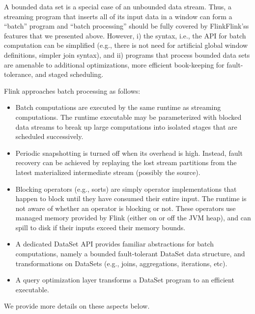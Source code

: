 \documentclass[11pt]{article}
\begin{document}
A bounded data set is a special case of an unbounded data stream. Thus, a streaming program that inserts all of its input data in a window can form a “batch” program and “batch processing” should be fully covered by FlinkFlink'ss features that we presented above. However, i) the syntax, i.e., the API for batch computation can be simplified (e.g., there is not need for artificial global window definitions, simpler join syntax), and ii) programs that process bounded data sets are amenable to additional optimizations, more efficient book-keeping for fault-tolerance, and staged scheduling.

\vspace{2mm}
\noindent Flink approaches batch processing as follows:\vspace{-3mm}
\begin{itemize}
	\item Batch computations are executed by the same runtime as streaming computations. The runtime executable may be parameterized with blocked data streams to break up large computations into isolated stages that are scheduled successively. \vspace{-3mm}
	\item Periodic snapshotting is turned off when its overhead is high. Instead, fault recovery can be achieved by replaying the lost stream partitions from the latest materialized intermediate stream (possibly the source).\vspace{-3mm}
	\item Blocking operators (e.g., sorts) are simply operator implementations that happen to block until they have consumed their entire input. The runtime is not aware of whether an operator is blocking or not. These operators use managed memory provided by Flink (either on or off the JVM heap), and can spill to disk if their inputs exceed their memory bounds.\vspace{-3mm}
	\item A dedicated DataSet API provides familiar abstractions for batch computations, namely a bounded fault-tolerant DataSet data structure, and transformations on DataSets (e.g., joins, aggregations, iterations, etc).\vspace{-3mm}
	\item A query optimization layer transforms a DataSet program to an efficient executable.\vspace{-3mm}
\end{itemize}

\noindent We provide more details on these aspects below.
\end{document}
